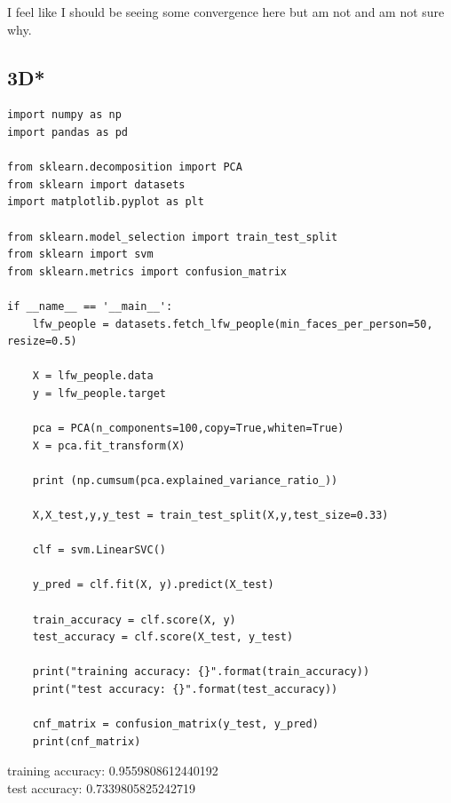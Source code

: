 \documentclass[12pt]{article}
\begin{document}
\begin{flushleft}
			I feel like I should be seeing some convergence here but am not and am not sure why.\\
		
		\subsection*{3D*}
		
			\begin{lstlisting}
import numpy as np 
import pandas as pd

from sklearn.decomposition import PCA
from sklearn import datasets
import matplotlib.pyplot as plt

from sklearn.model_selection import train_test_split
from sklearn import svm
from sklearn.metrics import confusion_matrix

if __name__ == '__main__':
	lfw_people = datasets.fetch_lfw_people(min_faces_per_person=50, resize=0.5)
	
	X = lfw_people.data
	y = lfw_people.target
	
	pca = PCA(n_components=100,copy=True,whiten=True)
	X = pca.fit_transform(X)
	
	print (np.cumsum(pca.explained_variance_ratio_))
	
	X,X_test,y,y_test = train_test_split(X,y,test_size=0.33)
	
	clf = svm.LinearSVC()
	
	y_pred = clf.fit(X, y).predict(X_test)
	
	train_accuracy = clf.score(X, y)
	test_accuracy = clf.score(X_test, y_test)
	
	print("training accuracy: {}".format(train_accuracy))
	print("test accuracy: {}".format(test_accuracy))
	
	cnf_matrix = confusion_matrix(y_test, y_pred)
	print(cnf_matrix)

			\end{lstlisting}
		
			training accuracy: 0.9559808612440192\\
			test accuracy: 0.7339805825242719\\


\end{flushleft}
\end{document}
